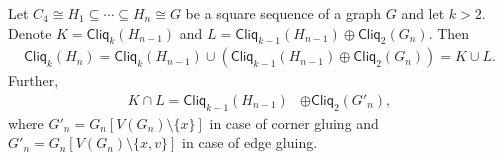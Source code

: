 \documentclass[a4paper, v2021]{lipics-v2021}
\theoremstyle{plain}
\theoremstyle{definition}
\newcommand{\Cliq}[2]{\mathsf{Cliq}_{#1}(#2)}
\begin{document}
\begin{lemma}\label{l:decomposition}
   Let $C_4 \cong H_1 \subseteq \cdots \subseteq H_n \cong G$ be a square sequence of a graph $G$ and let $k>2$. Denote $K = \Cliq{k}{H_{n-1}}$ and $L = \Cliq{k-1}{H_{n-1}} \oplus \Cliq{2}{G_{n}}$. Then 
   \begin{align*}
   \Cliq{k}{H_{n}} = \Cliq{k}{H_{n-1}} \cup (\Cliq{k-1}{H_{n-1}} \oplus \Cliq{2}{G_n}) = K \cup L.
    \end{align*} 
Further,
\begin{align*}
K \cap L = \Cliq{k-1}{H_{n-1}} &\oplus \Cliq{2}{G'_{n}},
\end{align*}
where $G'_{n} = G_n[V(G_{n}) \setminus \{x\}]$ in case of corner gluing and $G'_{n} = G_{n}[ V(G_n) \setminus \{x,v\}]$ in case of edge gluing.

\end{lemma}
\end{document}
